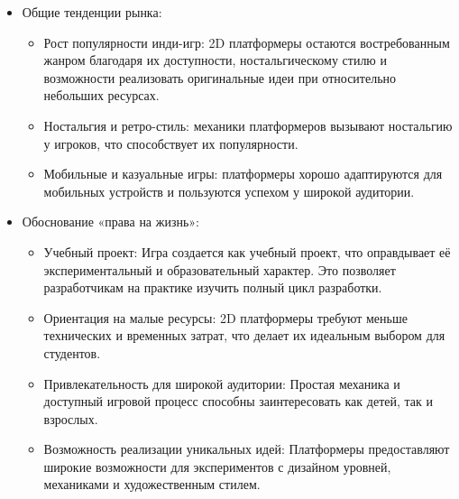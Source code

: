 \documentclass{article}
\begin{document}
\begin{itemize}
\item Общие тенденции рынка:
	\begin{itemize}
            \item Рост популярности инди-игр: 2D платформеры остаются востребованным жанром благодаря их доступности, ностальгическому стилю и возможности реализовать оригинальные идеи при относительно небольших ресурсах.
            \item Ностальгия и ретро-стиль: механики платформеров вызывают ностальгию у игроков, что способствует их популярности.
            \item Мобильные и казуальные игры: платформеры хорошо адаптируются для мобильных устройств и пользуются успехом у широкой аудитории.
	\end{itemize}

\item Обоснование «права на жизнь»:
	\begin{itemize}
            \item Учебный проект: Игра создается как учебный проект, что оправдывает её экспериментальный и образовательный характер. Это позволяет разработчикам на практике изучить полный цикл разработки.
            \item Ориентация на малые ресурсы: 2D платформеры требуют меньше технических и временных затрат, что делает их идеальным выбором для студентов.
            \item Привлекательность для широкой аудитории: Простая механика и доступный игровой процесс способны заинтересовать как детей, так и взрослых.
            \item Возможность реализации уникальных идей: Платформеры предоставляют широкие возможности для экспериментов с дизайном уровней, механиками и художественным стилем.
	\end{itemize}
\end{itemize}
\end{document}
